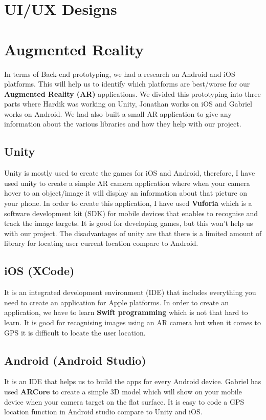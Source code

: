 
\section{UI/UX Designs}


\section{Augmented Reality}
In terms of Back-end prototyping, we had a research on Android and iOS platforms. This will help us to identify which platforms are best/worse for our \textbf {Augmented Reality (AR)} applications. We divided this prototyping into three parts where Hardik was working on Unity, Jonathan works on iOS and Gabriel works on Android. We had also built a small AR application to give any information about the various libraries and how they help with our project.

\subsection{Unity}
Unity is mostly used to create the games for iOS and Android, therefore, I have used unity to create a simple AR camera application where when your camera hover to an object/image it will display an information about that picture on your phone. In order to create this application, I have used \textbf {Vuforia} which is a software development kit (SDK) for mobile devices that enables to recognise and track the image targets. It is good for developing games, but this won’t help us with our project. The disadvantages of unity are that there is a limited amount of library for locating user current location compare to Android.

\subsection{iOS (XCode)}
It is an integrated development environment (IDE) that includes everything you need to create an application for Apple platforms. In order to create an application, we have to learn \textbf {Swift programming} which is not that hard to learn. It is good for recognising images using an AR camera but when it comes to GPS it is difficult to locate the user location.

\subsection{Android (Android Studio)}
It is an IDE that helps us to build the apps for every Android device. Gabriel has used \textbf {ARCore} to create a simple 3D model which will show on your mobile device when your camera target on the flat surface. It is easy to code a GPS location function in Android studio compare to Unity and iOS.
